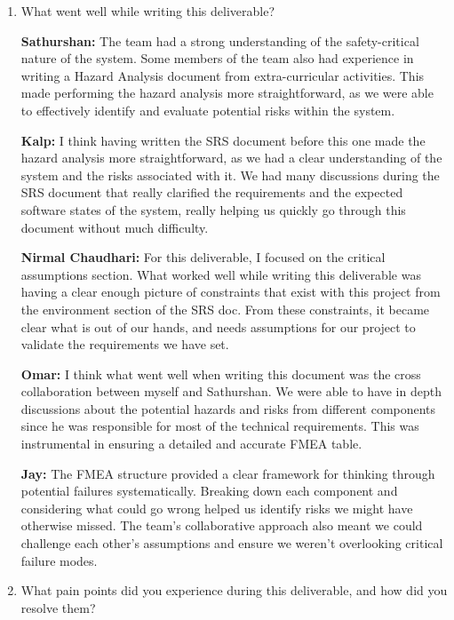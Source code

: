 \documentclass{article}
\begin{document}
\begin{enumerate}
    \item What went well while writing this deliverable? 
    
    \textbf{Sathurshan:} The team had a strong understanding of the
    safety-critical nature of the system. Some members of the team also had
    experience in writing a Hazard Analysis document from extra-curricular
    activities. This made performing the hazard analysis more straightforward,
    as we were able to effectively identify and evaluate potential risks within
    the system.

    \textbf{Kalp:} I think having written the SRS document before this one made
    the hazard analysis more straightforward, as we had a clear understanding of
    the system and the risks associated with it. We had many discussions during
    the SRS document that really clarified the requirements and the expected 
    software states of the system, really helping us quickly go through this 
    document without much difficulty.
    
    \textbf{Nirmal Chaudhari:} For this deliverable, I focused on the critical
    assumptions section. What worked well while writing this deliverable was 
    having a clear enough picture of constraints that exist with this project 
    from the environment section of the SRS doc. From these constraints, it 
    became clear what is out of our hands, and needs assumptions for our project 
    to validate the requirements we have set. 

    
    \textbf{Omar:} I think what went well when writing this document was the 
    cross collaboration between myself and Sathurshan. We were able to have
    in depth discussions about the potential hazards and risks from different 
    components since he was responsible for most of the technical requirements.
    This was instrumental in ensuring a detailed and accurate FMEA table.

    \textbf{Jay:} The FMEA structure provided a clear framework for thinking 
    through potential failures systematically. Breaking down each component and 
    considering what could go wrong helped us identify risks we might have 
    otherwise missed. The team's collaborative approach also meant we could 
    challenge each other's assumptions and ensure we weren't overlooking 
    critical failure modes.

    \item What pain points did you experience during this deliverable, and how
    did you resolve them?


\end{enumerate}
\end{document}
